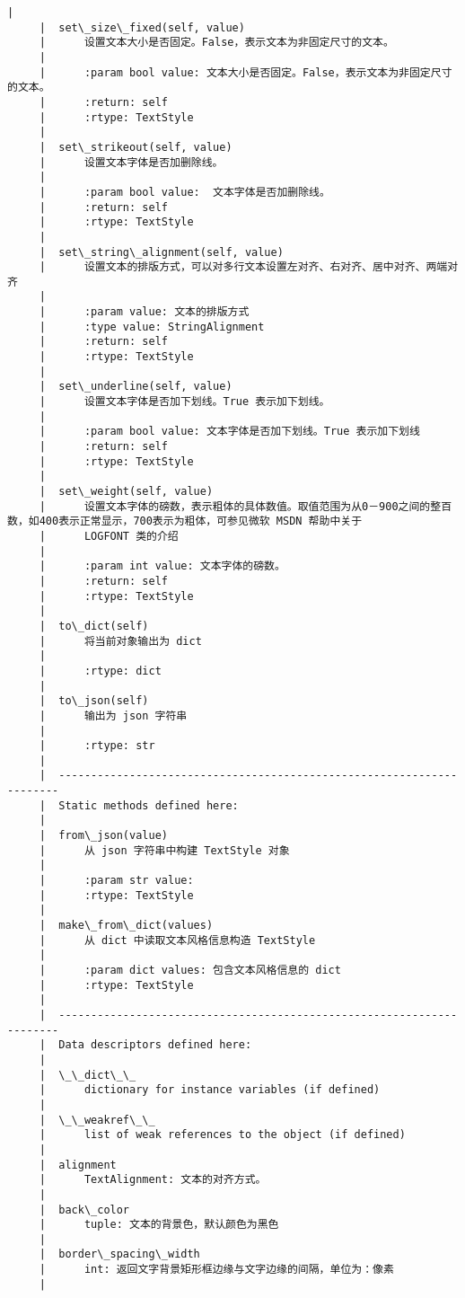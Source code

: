 \documentclass[11pt]{article}
\begin{document}
\begin{Verbatim}[commandchars=\\\{\}]
     |  
     |  set\_size\_fixed(self, value)
     |      设置文本大小是否固定。False，表示文本为非固定尺寸的文本。
     |      
     |      :param bool value: 文本大小是否固定。False，表示文本为非固定尺寸的文本。
     |      :return: self
     |      :rtype: TextStyle
     |  
     |  set\_strikeout(self, value)
     |      设置文本字体是否加删除线。
     |      
     |      :param bool value:  文本字体是否加删除线。
     |      :return: self
     |      :rtype: TextStyle
     |  
     |  set\_string\_alignment(self, value)
     |      设置文本的排版方式，可以对多行文本设置左对齐、右对齐、居中对齐、两端对齐
     |      
     |      :param value: 文本的排版方式
     |      :type value: StringAlignment
     |      :return: self
     |      :rtype: TextStyle
     |  
     |  set\_underline(self, value)
     |      设置文本字体是否加下划线。True 表示加下划线。
     |      
     |      :param bool value: 文本字体是否加下划线。True 表示加下划线
     |      :return: self
     |      :rtype: TextStyle
     |  
     |  set\_weight(self, value)
     |      设置文本字体的磅数，表示粗体的具体数值。取值范围为从0－900之间的整百数，如400表示正常显示，700表示为粗体，可参见微软 MSDN 帮助中关于
     |      LOGFONT 类的介绍
     |      
     |      :param int value: 文本字体的磅数。
     |      :return: self
     |      :rtype: TextStyle
     |  
     |  to\_dict(self)
     |      将当前对象输出为 dict
     |      
     |      :rtype: dict
     |  
     |  to\_json(self)
     |      输出为 json 字符串
     |      
     |      :rtype: str
     |  
     |  ----------------------------------------------------------------------
     |  Static methods defined here:
     |  
     |  from\_json(value)
     |      从 json 字符串中构建 TextStyle 对象
     |      
     |      :param str value:
     |      :rtype: TextStyle
     |  
     |  make\_from\_dict(values)
     |      从 dict 中读取文本风格信息构造 TextStyle
     |      
     |      :param dict values: 包含文本风格信息的 dict
     |      :rtype: TextStyle
     |  
     |  ----------------------------------------------------------------------
     |  Data descriptors defined here:
     |  
     |  \_\_dict\_\_
     |      dictionary for instance variables (if defined)
     |  
     |  \_\_weakref\_\_
     |      list of weak references to the object (if defined)
     |  
     |  alignment
     |      TextAlignment: 文本的对齐方式。
     |  
     |  back\_color
     |      tuple: 文本的背景色，默认颜色为黑色
     |  
     |  border\_spacing\_width
     |      int: 返回文字背景矩形框边缘与文字边缘的间隔，单位为：像素
     |  

\end{Verbatim}
\end{document}
